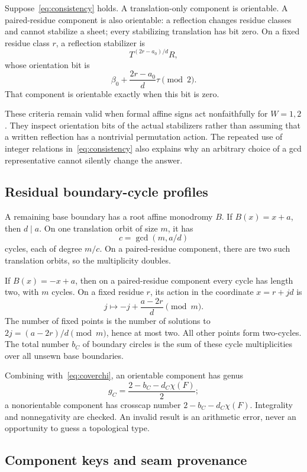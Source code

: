 \documentclass[11pt,a4paper]{article}
\theoremstyle{definition}\newtheorem{definition}[theorem]{Definition}
\theoremstyle{remark}\newtheorem{remark}[theorem]{Remark}
\begin{document}
Suppose~\eqref{eq:consistency} holds. A translation-only component is
orientable. A paired-residue component is also orientable: a reflection
changes residue classes and cannot stabilize a sheet; every stabilizing
translation has bit zero. On a fixed residue class $r$, a reflection
stabilizer is
\[
 T^{(2r-a_0)/d}R,
\]
whose orientation bit is
\begin{equation}\label{eq:fixedorientation}
 \beta_0+\frac{2r-a_0}{d}\tau\pmod2.
\end{equation}
That component is orientable exactly when this bit is zero.

These criteria remain valid when formal affine signs act nonfaithfully for
$W=1,2$. They inspect orientation bits of the actual stabilizers rather than
assuming that a written reflection has a nontrivial permutation action.
The repeated use of integer relations in~\eqref{eq:consistency} also explains
why an arbitrary choice of a gcd representative cannot silently change the
answer.

\subsection{Residual boundary-cycle profiles}

A remaining base boundary has a root affine monodromy $B$. If
$B(x)=x+a$, then $d\mid a$. On one translation orbit of size $m$, it has
\[
 c=\gcd(m,a/d)
\]
cycles, each of degree $m/c$. On a paired-residue component, there are two
such translation orbits, so the multiplicity doubles.

If $B(x)=-x+a$, then on a paired-residue component every cycle has length
two, with $m$ cycles. On a fixed residue $r$, its action in the coordinate
$x=r+jd$ is
\[
 j\longmapsto -j+\frac{a-2r}{d}\pmod m.
\]
The number of fixed points is the number of solutions to
$2j=(a-2r)/d\pmod m$, hence at most two. All other points form two-cycles.
The total number $b_C$ of boundary circles is the sum of these cycle
multiplicities over all unsewn base boundaries.

Combining with~\eqref{eq:coverchi}, an orientable component has genus
\[
 g_C=\frac{2-b_C-d_C\chi(F)}2;
\]
a nonorientable component has crosscap number
$2-b_C-d_C\chi(F)$. Integrality and nonnegativity are checked. An invalid
result is an arithmetic error, never an opportunity to guess a topological
type.

\subsection{Component keys and seam provenance}
\end{document}
